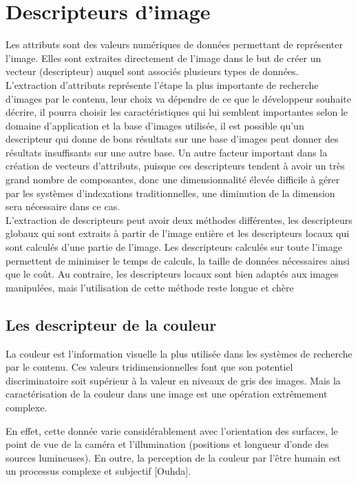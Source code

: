 \section{Descripteurs d'image}
Les attributs sont des valeurs numériques de données permettant de
représenter l’image. Elles sont extraites directement de l’image dans le but
de créer un vecteur (descripteur) auquel sont associés plusieurs types de
données. L’extraction d’attributs représente l’étape la plus importante de
recherche d’images par le contenu, leur choix va dépendre de ce que le
développeur souhaite décrire, il pourra choisir les caractéristiques qui lui
semblent importantes selon le domaine d’application et la base d’images
utilisée, il est possible qu’un descripteur qui donne de bons résultats sur
une base d’images peut donner des résultats insuffisants sur une autre
base. Un autre facteur important dans la création de vecteurs d'attributs,
puisque ces descripteurs tendent à avoir un très grand nombre de
composantes, donc une dimensionnalité élevée difficile à gérer par les
systèmes d’indexations traditionnelles, une diminution de la dimension sera
nécessaire dans ce cas.\\

L'extraction de descripteurs peut avoir deux méthodes différentes, les
descripteurs globaux qui sont extraits à partir de l’image entière et les
descripteurs locaux qui sont calculés d'une partie de l'image. Les
descripteurs calculés sur toute l’image permettent de minimiser le temps de
calculs, la taille de données nécessaires ainsi que le coût. Au contraire, les descripteurs locaux sont bien adaptés aux images manipulées, mais
l’utilisation de cette méthode reste longue et chère
\subsection{Les descripteur de la couleur}
La couleur est l’information visuelle la plus utilisée dans les systèmes de recherche par le contenu. Ces valeurs tridimensionnelles font que son potentiel discriminatoire soit supérieur à la valeur en niveaux de gris des images. Mais la caractérisation de la couleur dans une image est une opération extrêmement complexe.

En effet, cette donnée varie considérablement avec l’orientation des surfaces, le point de vue de la caméra et l’illumination (positions et longueur d'onde des sources lumineuses). En outre, la perception de la couleur par l'être humain est un processus complexe et subjectif [Ouhda].\\

